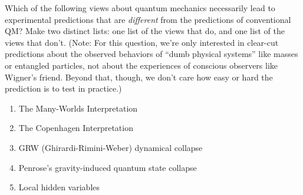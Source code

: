 \begin{solution}[label=ques:2]
  \begin{question}
  Which of the following views about quantum mechanics necessarily
  lead to experimental predictions that are \emph{different} from the
  predictions of conventional QM? 
  Make two distinct lists: one list of the views that do, and one list of the views that don't.
  (Note: For this question, we're only interested in clear-cut predictions about the observed behaviors of ``dumb physical systems'' like masses or entangled particles, not about the experiences of conscious observers like Wigner's friend.  Beyond that, though, we don't care how easy or hard the prediction is to test in practice.)
  \begin{enumerate}[label=(\Alph*)]
    \item The Many-Worlds Interpretation
    
    \item The Copenhagen Interpretation
    
    \item GRW (Ghirardi-Rimini-Weber) dynamical collapse
    
    \item Penrose's gravity-induced quantum state collapse
    
    \item Local hidden variables
    

\end{enumerate}
\end{question}
\end{solution}
